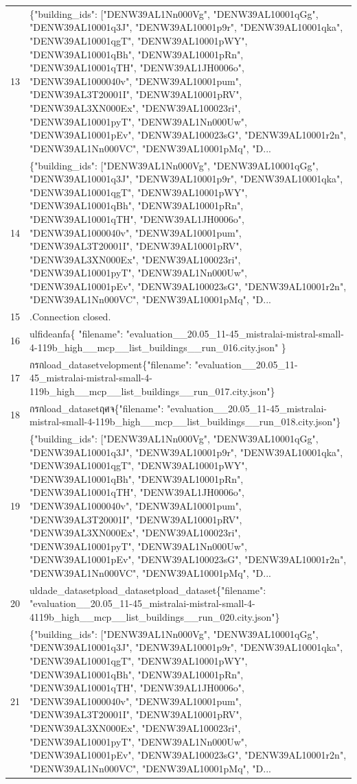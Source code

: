 \documentclass[a4paper,11pt]{article}
\begin{document}
\begin{table}[ht]
\begin{tabular}{r p{12cm}}
13 & \{"building\_ids": ["DENW39AL1Nn000Vg", "DENW39AL10001qGg", "DENW39AL10001q3J", "DENW39AL10001p9r", "DENW39AL10001qka", "DENW39AL10001qgT", "DENW39AL10001pWY", "DENW39AL10001qBh", "DENW39AL10001pRn", "DENW39AL10001qTH", "DENW39AL1JH0006o", "DENW39AL1000040v", "DENW39AL10001pum", "DENW39AL3T20001I", "DENW39AL10001pRV", "DENW39AL3XN000Ex", "DENW39AL100023ri", "DENW39AL10001pyT", "DENW39AL1Nn000Uw", "DENW39AL10001pEv", "DENW39AL100023sG", "DENW39AL10001r2n", "DENW39AL1Nn000VC", "DENW39AL10001pMq", "D... \\
14 & \{"building\_ids": ["DENW39AL1Nn000Vg", "DENW39AL10001qGg", "DENW39AL10001q3J", "DENW39AL10001p9r", "DENW39AL10001qka", "DENW39AL10001qgT", "DENW39AL10001pWY", "DENW39AL10001qBh", "DENW39AL10001pRn", "DENW39AL10001qTH", "DENW39AL1JH0006o", "DENW39AL1000040v", "DENW39AL10001pum", "DENW39AL3T20001I", "DENW39AL10001pRV", "DENW39AL3XN000Ex", "DENW39AL100023ri", "DENW39AL10001pyT", "DENW39AL1Nn000Uw", "DENW39AL10001pEv", "DENW39AL100023sG", "DENW39AL10001r2n", "DENW39AL1Nn000VC", "DENW39AL10001pMq", "D... \\
15 & .Connection closed. \\
16 & ulfideanfa\{
  "filename": "evaluation\_\_20.05\_11-45\_mistralai-mistral-small-4-119b\_high\_\_mcp\_\_list\_buildings\_\_run\_016.city.json"
\} \\
17 &  กรกload\_datasetvelopment\{"filename": "evaluation\_\_20.05\_11-45\_mistralai-mistral-small-4-119b\_high\_\_mcp\_\_list\_buildings\_\_run\_017.city.json"\} \\
18 &  กรกload\_datasetฤศจ\{"filename": "evaluation\_\_20.05\_11-45\_mistralai-mistral-small-4-119b\_high\_\_mcp\_\_list\_buildings\_\_run\_018.city.json"\} \\
19 & \{"building\_ids": ["DENW39AL1Nn000Vg", "DENW39AL10001qGg", "DENW39AL10001q3J", "DENW39AL10001p9r", "DENW39AL10001qka", "DENW39AL10001qgT", "DENW39AL10001pWY", "DENW39AL10001qBh", "DENW39AL10001pRn", "DENW39AL10001qTH", "DENW39AL1JH0006o", "DENW39AL1000040v", "DENW39AL10001pum", "DENW39AL3T20001I", "DENW39AL10001pRV", "DENW39AL3XN000Ex", "DENW39AL100023ri", "DENW39AL10001pyT", "DENW39AL1Nn000Uw", "DENW39AL10001pEv", "DENW39AL100023sG", "DENW39AL10001r2n", "DENW39AL1Nn000VC", "DENW39AL10001pMq", "D... \\
20 & uldade\_datasetpload\_datasetpload\_dataset\{"filename": "evaluation\_\_20.05\_11-45\_mistralai-mistral-small-4-4119b\_high\_\_mcp\_\_list\_buildings\_\_run\_020.city.json"\} \\
21 & \{"building\_ids": ["DENW39AL1Nn000Vg", "DENW39AL10001qGg", "DENW39AL10001q3J", "DENW39AL10001p9r", "DENW39AL10001qka", "DENW39AL10001qgT", "DENW39AL10001pWY", "DENW39AL10001qBh", "DENW39AL10001pRn", "DENW39AL10001qTH", "DENW39AL1JH0006o", "DENW39AL1000040v", "DENW39AL10001pum", "DENW39AL3T20001I", "DENW39AL10001pRV", "DENW39AL3XN000Ex", "DENW39AL100023ri", "DENW39AL10001pyT", "DENW39AL1Nn000Uw", "DENW39AL10001pEv", "DENW39AL100023sG", "DENW39AL10001r2n", "DENW39AL1Nn000VC", "DENW39AL10001pMq", "D... \\

\end{tabular}
\end{table}
\end{document}
